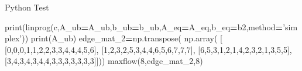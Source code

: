 \documentclass[
  ignorenonframetext,
]{beamer}
\newenvironment{Shaded}{\begin{snugshade}}{\end{snugshade}}
\newcommand{\BuiltInTok}[1]{#1}
\newcommand{\DecValTok}[1]{\textcolor[rgb]{0.00,0.00,0.81}{#1}}
\newcommand{\NormalTok}[1]{#1}
\newcommand{\OperatorTok}[1]{\textcolor[rgb]{0.81,0.36,0.00}{\textbf{#1}}}
\newcommand{\StringTok}[1]{\textcolor[rgb]{0.31,0.60,0.02}{#1}}
\begin{document}
\begin{frame}[fragile]{Python Test}
\begin{Shaded}
\begin{Highlighting}[]
  
  \BuiltInTok{print}\NormalTok{(linprog(c,A_ub}\OperatorTok{=}\NormalTok{A_ub,b_ub}\OperatorTok{=}\NormalTok{b_ub,A_eq}\OperatorTok{=}\NormalTok{A_eq,b_eq}\OperatorTok{=}\NormalTok{b2,method}\OperatorTok{=}\StringTok{'simplex'}\NormalTok{))}
  \BuiltInTok{print}\NormalTok{(A_ub)}
\NormalTok{edge_mat_2}\OperatorTok{=}\NormalTok{np.transpose(}
\NormalTok{    np.array( [}
\NormalTok{              [}\DecValTok{0}\NormalTok{,}\DecValTok{0}\NormalTok{,}\DecValTok{0}\NormalTok{,}\DecValTok{1}\NormalTok{,}\DecValTok{1}\NormalTok{,}\DecValTok{2}\NormalTok{,}\DecValTok{2}\NormalTok{,}\DecValTok{3}\NormalTok{,}\DecValTok{3}\NormalTok{,}\DecValTok{4}\NormalTok{,}\DecValTok{4}\NormalTok{,}\DecValTok{4}\NormalTok{,}\DecValTok{5}\NormalTok{,}\DecValTok{6}\NormalTok{],}
\NormalTok{              [}\DecValTok{1}\NormalTok{,}\DecValTok{2}\NormalTok{,}\DecValTok{3}\NormalTok{,}\DecValTok{2}\NormalTok{,}\DecValTok{5}\NormalTok{,}\DecValTok{3}\NormalTok{,}\DecValTok{4}\NormalTok{,}\DecValTok{4}\NormalTok{,}\DecValTok{6}\NormalTok{,}\DecValTok{5}\NormalTok{,}\DecValTok{6}\NormalTok{,}\DecValTok{7}\NormalTok{,}\DecValTok{7}\NormalTok{,}\DecValTok{7}\NormalTok{],}
\NormalTok{              [}\DecValTok{6}\NormalTok{,}\DecValTok{5}\NormalTok{,}\DecValTok{3}\NormalTok{,}\DecValTok{1}\NormalTok{,}\DecValTok{2}\NormalTok{,}\DecValTok{1}\NormalTok{,}\DecValTok{4}\NormalTok{,}\DecValTok{2}\NormalTok{,}\DecValTok{3}\NormalTok{,}\DecValTok{2}\NormalTok{,}\DecValTok{1}\NormalTok{,}\DecValTok{3}\NormalTok{,}\DecValTok{5}\NormalTok{,}\DecValTok{5}\NormalTok{],}
\NormalTok{              [}\DecValTok{3}\NormalTok{,}\DecValTok{4}\NormalTok{,}\DecValTok{3}\NormalTok{,}\DecValTok{4}\NormalTok{,}\DecValTok{3}\NormalTok{,}\DecValTok{4}\NormalTok{,}\DecValTok{4}\NormalTok{,}\DecValTok{3}\NormalTok{,}\DecValTok{3}\NormalTok{,}\DecValTok{3}\NormalTok{,}\DecValTok{3}\NormalTok{,}\DecValTok{3}\NormalTok{,}\DecValTok{3}\NormalTok{,}\DecValTok{3}\NormalTok{]]))}
\NormalTok{maxflow(}\DecValTok{8}\NormalTok{,edge_mat_2,}\DecValTok{8}\NormalTok{)              }
\end{Highlighting}
\end{Shaded}


\end{frame}
\end{document}
